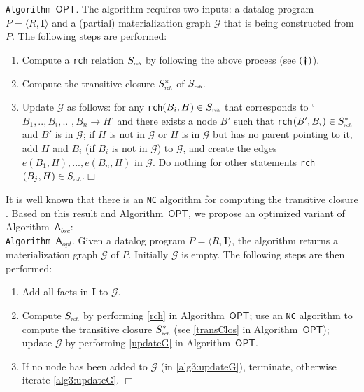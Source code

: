 \documentclass[final,1p,times]{elsarticle}
\begin{document}
\noindent\texttt{Algorithm~$\mathsf{OPT}$}. The algorithm requires two inputs:
a datalog program $P=\langle R, \textbf{I}\rangle$ and a (partial) materialization graph $\mathcal{G}$ that is
being constructed from $P$. The following steps are performed:
\begin{enumerate}[leftmargin=6ex,label=(\textbf{\roman*})]
\item Compute a \texttt{rch} relation $S_{\textit{\tiny rch}}$ by following the above process (see $(\textbf{\dag})$).\label{rch}
\item Compute the transitive closure $S^*_{\textit{\tiny rch}}$ of $S_{\textit{\tiny rch}}$.\label{transClos}
\item Update $\mathcal{G}$ as follows: for any \texttt{rch}$(B_i,H)\in S_{\textit{\tiny rch}}$
that corresponds to `$B_1,..,B_i,..$ $,B_n\rightarrow H$'
    and there exists a node $B'$ such that \texttt{rch}$(B',B_i)\in S^*_{\textit{\tiny rch}}$ and $B'$ is
    in $\mathcal{G}$; if $H$ is not in $\mathcal{G}$ or $H$ is in $\mathcal{G}$ but has no parent pointing
    to it, add $H$ and $B_i$ (if $B_i$ is not in $\mathcal{G}$) to $\mathcal{G}$, and create the edges
    $e(B_1, H),...,e(B_n, H)$ in $\mathcal{G}$. Do nothing for other statements
    \texttt{rch}$(B_j,H)\in S_{\textit{\tiny rch}}$.\label{updateG}\hfill$\Box$
\end{enumerate}

It is well known that there is an \texttt{NC} algorithm for computing the
transitive closure \cite{Allender07}.
Based on this result and Algorithm~$\mathsf{OPT}$, we propose an optimized variant of Algorithm~$\mathsf{A}_{bsc}$:\\

\noindent\texttt{Algorithm~$\mathsf{A}_{opt}$}. Given a datalog program $P=\langle R, \textbf{I}\rangle$, the algorithm
returns a materialization graph $\mathcal{G}$ of $P$. Initially $\mathcal{G}$ is empty. The following steps are then performed:
\begin{enumerate}[leftmargin=8ex,label=(\textit{Step \arabic*}),ref=Step~\arabic*]
\item Add all facts in $\textbf{I}$ to $\mathcal{G}$.\label{alg3:addFacts}
\item Compute $S_{\textit{\tiny rch}}$ by performing \ref{rch} in Algorithm~$\mathsf{OPT}$; use an \texttt{NC}
    algorithm to compute the transitive closure $S^*_{\textit{\tiny rch}}$ (see \ref{transClos} in Algorithm~$\mathsf{OPT}$);
    update $\mathcal{G}$ by performing \ref{updateG}  in Algorithm~$\mathsf{OPT}$.\label{alg3:updateG}
\item If no node has been added to $\mathcal{G}$ (in \ref{alg3:updateG}), terminate,
    otherwise iterate \ref{alg3:updateG}. \label{alg3:halt}\hfill$\Box$
\end{enumerate}
\end{document}

